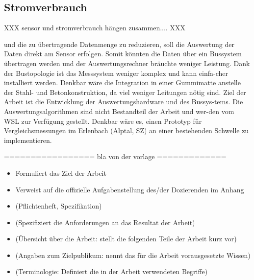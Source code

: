 \subsection{Stromverbrauch}
XXX sensor und stromverbrauch hängen zusammen.... XXX

 und die zu übertragende Datenmenge zu reduzieren, soll die Auswertung der Daten direkt am Sensor erfolgen. Somit könnten die Daten über ein Bussystem übertragen werden und der Auswertungsrechner bräuchte weniger Leistung.
Dank der Bustopologie ist das Messsystem weniger komplex und kann einfa-cher installiert werden. Denkbar wäre die Integration in einer Gummimatte anstelle der Stahl- und Betonkonstruktion, da viel weniger Leitungen nötig sind.
Ziel der Arbeit ist die Entwicklung der Auswertungshardware und des Bussys-tems. Die Auswertungsalgorithmen sind nicht Bestandteil der Arbeit und wer-den vom WSL zur Verfügung gestellt.
Denkbar wäre es, einen Prototyp für Vergleichsmessungen im Erlenbach (Alptal, SZ) an einer bestehenden Schwelle zu implementieren.





================= bla von der vorlage =============
\begin{itemize}
\item Formuliert das Ziel der Arbeit
\item Verweist auf die offizielle Aufgabenstellung des/der Dozierenden im Anhang
\item (Pflichtenheft, Spezifikation)
\item (Spezifiziert die Anforderungen an das Resultat der Arbeit)
\item (Übersicht über die Arbeit: stellt die folgenden Teile der Arbeit kurz vor)
\item (Angaben zum Zielpublikum: nennt das für die Arbeit vorausgesetzte Wissen)
\item (Terminologie: Definiert die in der Arbeit verwendeten Begriffe)
\end{itemize}
